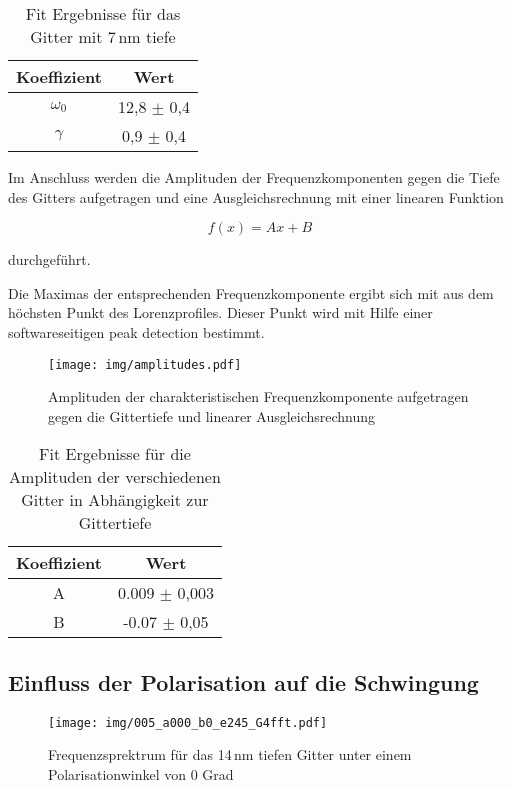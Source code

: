 \begin{table}[!htbp]
 \centering
\begin{tabular}{cc}
    Koeffizient & Wert \\
	\midrule
 	$\omega_0$ & 12,8 $\pm$ 0,4 \\
 	$\gamma$ & 0,9 $\pm$ 0,4 \\
\end{tabular}
\caption{Fit Ergebnisse für das Gitter mit 7\,nm tiefe}
\label{tab:fit}
\end{table}

\newpage

Im Anschluss werden die Amplituden der Frequenzkomponenten gegen die Tiefe des Gitters aufgetragen und eine Ausgleichsrechnung
mit einer linearen Funktion

\begin{equation}
f(x) = Ax + B
\end{equation}

\noindent durchgeführt.

\noindent Die Maximas der entsprechenden Frequenzkomponente ergibt sich mit aus dem höchsten Punkt des Lorenzprofiles. Dieser Punkt wird mit Hilfe einer
softwareseitigen peak detection bestimmt.

\begin{figure}[!htbp]
 	\centering
 	\texttt{[image: img/amplitudes.pdf]}
 	\caption{Amplituden der charakteristischen Frequenzkomponente aufgetragen gegen die Gittertiefe und linearer Ausgleichsrechnung}
 	\label{abb:film}
\end{figure}

\begin{table}[!htbp]
 \centering
\begin{tabular}{cc}
    Koeffizient & Wert \\
	\midrule
 	A & 0.009 $\pm$ 0,003 \\
 	B & -0.07 $\pm$ 0,05 \\
\end{tabular}
\caption{Fit Ergebnisse für die Amplituden der verschiedenen Gitter in Abhängigkeit zur Gittertiefe}
\label{tab:fit}
\end{table}

\newpage

\subsection{Einfluss der Polarisation auf die Schwingung}

\begin{figure}[!htbp]
 	\centering
 	\texttt{[image: img/005\_a000\_b0\_e245\_G4fft.pdf]}
 	\caption{Frequenzsprektrum für das 14\,nm tiefen Gitter unter einem Polarisationwinkel von 0 Grad}
 	\label{abb:film}
\end{figure}

